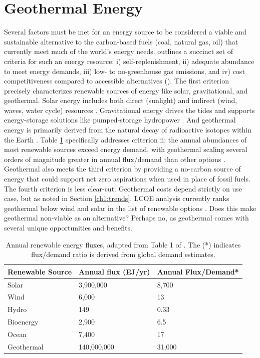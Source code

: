 \section{Geothermal Energy}\label{ch1:geothermal}
Several factors must be met for an energy source to be considered a viable and sustainable alternative to the carbon-based fuels (coal, natural gas, oil) that currently meet much of the world’s energy needs. \citeauthor{glassley_geothermal_2015} outlines a succinct set of criteria for such an energy resource: i) self-replenishment, ii) adequate abundance to meet energy demands, iii) low- to no-greenhouse gas emissions, and iv) cost competitiveness compared to accessible alternatives (\citeyear[p.\ 7]{glassley_geothermal_2015}). The first criterion precisely characterizes renewable sources of energy like solar, gravitational, and geothermal. Solar energy includes both direct (sunlight) and indirect (wind, waves, water cycle) resources \citep{hohmeyer_ipcc_2008}. Gravitational energy drives the tides and supports energy-storage solutions like pumped-storage hydropower \citep{eere_pumped-storage_2021,hohmeyer_ipcc_2008}. And geothermal energy is primarily derived from the natural decay of radioactive isotopes within the Earth \citep{hohmeyer_ipcc_2008}. Table \ref{tab:renewableflux} specifically addresses criterion ii; the annual abundances of most renewable sources exceed energy demand, with geothermal scaling several orders of magnitude greater in annual flux/demand than other options \citep{hohmeyer_ipcc_2008}. Geothermal also meets the third criterion by providing a no-carbon source of energy that could support net zero aspirations when used in place of fossil fuels. The fourth criterion is less clear-cut. Geothermal costs depend strictly on use case, but as noted in Section \ref{ch1:trends}, LCOE analysis currently ranks geothermal below wind and solar in the list of renewable options \citep{lazard_lazards_2020}. Does this make geothermal non-viable as an alternative? Perhaps no, as geothermal comes with several unique opportunities and benefits.

\begin{table}[h!]
\centering
\begin{tabular}{|l|l|l|}
\hline
\textbf{Renewable Source} & \textbf{Annual flux (EJ/yr)} & \textbf{Annual Flux/Demand*} \\ \hline
Solar      & 3,900,000   & 8,700  \\ \hline
Wind       & 6,000       & 13     \\ \hline
Hydro      & 149         & 0.33   \\ \hline
Bioenergy  & 2,900       & 6.5    \\ \hline
Ocean      & 7,400       & 17     \\ \hline
Geothermal & 140,000,000 & 31,000 \\ \hline
\end{tabular}
\caption[Annual renewable energy fluxes]{Annual renewable energy fluxes, adapted from Table 1 of \protect\citep{hohmeyer_ipcc_2008}. The (*) indicates flux/demand ratio is derived from global demand estimates.}
\label{tab:renewableflux}
\end{table}

